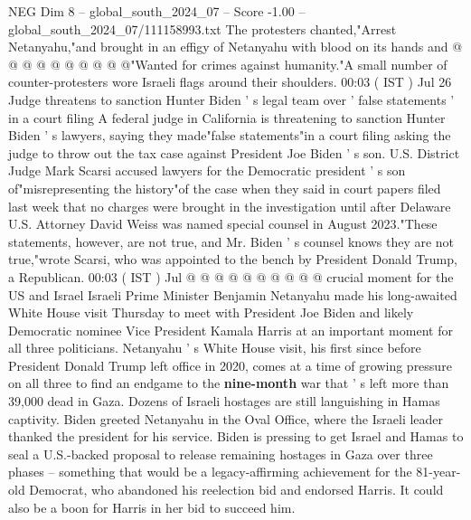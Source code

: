 \begin{textsample}{NEG Dim 8 – global\_south\_2024\_07 – Score -1.00 – global\_south\_2024\_07/111158993.txt}
The protesters chanted,"Arrest Netanyahu,"and brought in an effigy of Netanyahu with blood on its hands and @ @ @ @ @ @ @ @ @ @"Wanted for crimes against humanity."A small number of counter-protesters wore Israeli flags around their shoulders. 00:03 ( IST ) Jul 26 Judge threatens to sanction Hunter Biden ' s legal team over ' false statements ' in a court filing A federal judge in California is threatening to sanction Hunter Biden ' s lawyers, saying they made"false statements"in a court filing asking the judge to throw out the tax case against President Joe Biden ' s son.
U.S.
District Judge Mark Scarsi accused lawyers for the Democratic president ' s son of"misrepresenting the history"of the case when they said in court papers filed last week that no charges were brought in the investigation until after Delaware U.S.
Attorney David Weiss was named special counsel in August 2023."These statements, however, are not true, and Mr.
Biden ' s counsel knows they are not true,"wrote Scarsi, who was appointed to the bench by President Donald Trump, a Republican. 00:03 ( IST ) Jul @ @ @ @ @ @ @ @ @ @ crucial moment for the US and Israel Israeli Prime Minister Benjamin Netanyahu made his long-awaited White House visit Thursday to meet with President Joe Biden and likely Democratic nominee Vice President Kamala Harris at an important moment for all three politicians.
Netanyahu ' s White House visit, his first since before President Donald Trump left office in 2020, comes at a time of growing pressure on all three to find an endgame to the \textbf{nine-month} war that ' s left more than 39,000 dead in Gaza.
Dozens of Israeli hostages are still languishing in Hamas captivity.
Biden greeted Netanyahu in the Oval Office, where the Israeli leader thanked the president for his service.
Biden is pressing to get Israel and Hamas to seal a U.S.-backed proposal to release remaining hostages in Gaza over three phases -- something that would be a legacy-affirming achievement for the 81-year-old Democrat, who abandoned his reelection bid and endorsed Harris.
It could also be a boon for Harris in her bid to succeed him.

\end{textsample}
